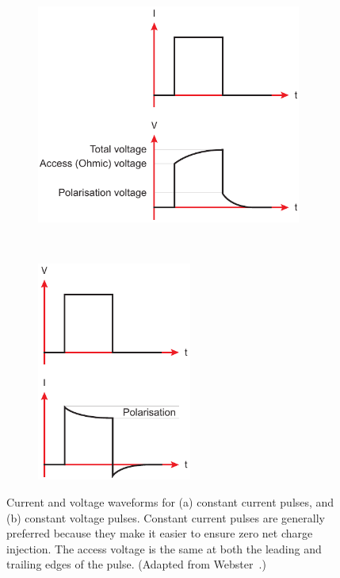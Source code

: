 \begin{figure}
	\centering
	\begin{subfigure}[t]{0.6\textwidth}
        \centering
        \includegraphics[height=7.2cm]{Background/constant_current}
        \caption{ }
        \label{fig:const_current_waveform}
    \end{subfigure}
    ~
    \begin{subfigure}[t]{0.375\textwidth}
        \centering
        \includegraphics[height=7.2cm]{Background/constant_voltage}
        \caption{ }
        \label{fig:const_voltage_waveform}
    \end{subfigure}
    
	\caption[Constant current versus constant voltage waveforms]{Current and
	voltage waveforms for (a) constant current pulses, and (b) constant voltage
	pulses. Constant current pulses are generally preferred because they make it
	easier to ensure zero net charge injection. The access voltage is the same at
	both the leading and trailing edges of the pulse. (Adapted from
	Webster~\cite{webster1998}.)}
	\label{fig:current_voltage_waveforms}
\end{figure}

